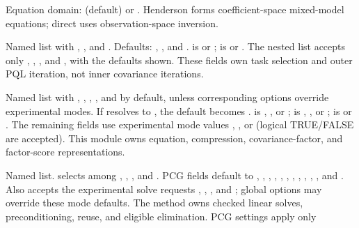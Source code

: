 \documentclass[a4paper]{book}
\begin{document}
\begin{Arguments}
\begin{ldescription}
\item[\code{formulation}] Equation domain:  (default) or
. Henderson forms coefficient-space mixed-model equations;
direct uses observation-space inversion.
\item[\code{task}] Named list with , , and .
Defaults: , , and
.
 is  or ;  is
 or . The nested  list accepts only
, , , and , with
the defaults shown. These fields own task selection and outer PQL iteration,
not inner covariance iterations.
\item[\code{representation}] Named list with ,
, ,
, and  by default,
unless corresponding  options override experimental modes.
If  resolves to , the default
 becomes .
 is , , or ;
 is , , or
;  is  or
. The remaining fields use experimental mode values
, , or  (logical TRUE/FALSE are
accepted). This module owns equation, compression, covariance-factor, and
factor-score representations.
\item[\code{solve}] Named list.  selects among
, , , and .
PCG fields default to , ,
, ,
, ,
, ,
, ,
, and .
Also accepts the experimental solve requests ,
, , and
; global  options may override
these mode defaults. The method owns checked linear solves,
preconditioning, reuse, and eligible elimination. PCG settings apply only

\end{ldescription}
\end{Arguments}
\end{document}
